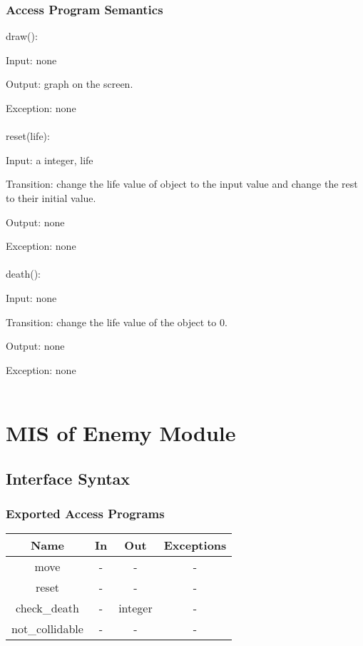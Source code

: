 \documentclass[12,english]{article}
\begin{document}
		\subsubsection{Access Program Semantics}
	    draw():
		
		Input: none
			
		Output: graph on the screen.
			 
		Exception: none\\
		\\
		reset(life):
		
		Input: a integer, life
		
		Transition: change the life value of object to the input value and change the rest to their initial value.
	            	
	   Output: none
	
		Exception: none\\ 
		\\
		death():
		
		Input: none
		
		Transition: change the life value of the object to 0.
	
	    Output: none
	
		Exception: none\\ 
		\\


\section{MIS of Enemy Module}
	\subsection{Interface Syntax}
		\subsubsection{Exported Access Programs}
		\begin{table}[!htbp]
				\begin{tabular}{|c|c|c|c|}
					\hline
					Name & In & Out & Exceptions \\ \hline
					move & - & - & - \\ \hline
					reset & - & - & - \\ \hline
					check\_death & - & integer & -\\ \hline
					not\_collidable & - & - & -\\ \hline
				\end{tabular}
			\end{table}
\end{document}
